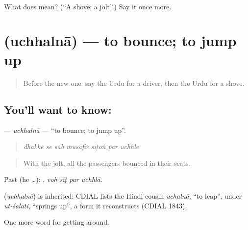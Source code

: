 \begin{tcolorbox}[breakable,colback=teal!4,colframe=teal!35!black,title={Before you move on}]
What does  mean? (\textquotedblleft{}A shove; a jolt\textquotedblright{}.) Say it once more.
\end{tcolorbox}
\section[\texorpdfstring{\ur{اچھلنا} (uchhalnā)}{اچھلنا (uchhalnā)}]{ (uchhalnā) — to bounce; to jump up}

\label{lesson:UR-C394-uchhalna}



\begin{quote}
Before the new one: say the Urdu for a driver, then the Urdu for a shove.
\end{quote}

\subsection*{You'll want to know: }
\textbf{} — \emph{uchhalnā} — \textquotedblleft{}to bounce; to jump up\textquotedblright{}.

\begin{quote}
      
\end{quote}

\begin{quote}
\emph{dhakke se sab musāfir sīṭoṅ par uchhle.}
\end{quote}

\begin{quote}
With the jolt, all the passengers bounced in their seats.
\end{quote}

Past (he …):    , \emph{voh sīṭ par uchhlā}.

\begin{cousinweb}
\textbf{} (\emph{uchhalnā}) is inherited: CDIAL lists the Hindi cousin \emph{uchalnā}, \textquotedblleft{}to leap\textquotedblright{}, under \emph{ut-śalati}, \textquotedblleft{}springs up\textquotedblright{}, a form it reconstructs (CDIAL 1843).
\end{cousinweb}

\begin{grammarlens}[title={What you've built}]
One more word for getting around.
\end{grammarlens}

